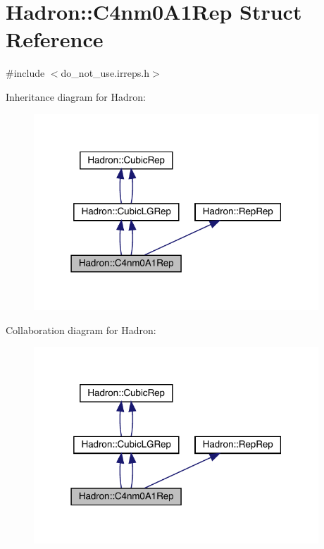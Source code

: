 \hypertarget{structHadron_1_1C4nm0A1Rep}{}\section{Hadron\+:\+:C4nm0\+A1\+Rep Struct Reference}
\label{structHadron_1_1C4nm0A1Rep}


{\ttfamily \#include $<$do\+\_\+not\+\_\+use.\+irreps.\+h$>$}



Inheritance diagram for Hadron\+:\nopagebreak
\begin{figure}[H]
\begin{center}
\leavevmode
\includegraphics[width=303pt]{da/d93/structHadron_1_1C4nm0A1Rep__inherit__graph}
\end{center}
\end{figure}


Collaboration diagram for Hadron\+:\nopagebreak
\begin{figure}[H]
\begin{center}
\leavevmode
\includegraphics[width=303pt]{d4/d40/structHadron_1_1C4nm0A1Rep__coll__graph}
\end{center}
\end{figure}
